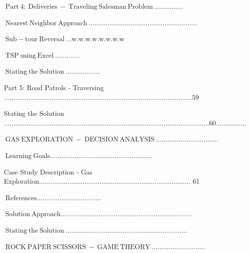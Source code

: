 \documentclass[10pt]{article}
\begin{document}
$\mathrm{~ P a r t ~ 4 : ~ D e l i v e r i e s ~ - ~ T r a v e l i n g ~ S a l e s m a n ~ P r o b l e m ~ . . . . . . . . . . . . . . .}$

$\mathrm{~ N e a r e s t ~ N e i g h b o r ~ A p p r o a c h ~ . . . . . . . . . . . . . . . . . . . . . . . . . . . . . . . . . . . . . . . . . . . . . . . . . . . . . . . . .}$

$\mathrm{~ S u b - t o u r ~ R e v e r s a l ~ . . . w . w . w . w . w . w . w . w}$

$\mathrm{~ T S P ~ u s i n g ~ E x c e l ~ . . . . . . . . . . . . .}$

$\mathrm{~ S t a t i n g ~ t h e ~ S o l u t i o n ~ . . . . . . . . . . . . . . . . . .}$

Part 5: Road Patrols - Traversing $\ldots \ldots \ldots \ldots \ldots \ldots \ldots \ldots \ldots \ldots \ldots \ldots \ldots \ldots \ldots \ldots \ldots \ldots \ldots \ldots \ldots \ldots \ldots \ldots \ldots \ldots \ldots \ldots \ldots \ldots \ldots \ldots \ldots 59$

Stating the Solution $\ldots \ldots \ldots \ldots \ldots \ldots \ldots \ldots \ldots \ldots \ldots \ldots \ldots \ldots \ldots \ldots \ldots \ldots \ldots \ldots \ldots \ldots \ldots \ldots \ldots \ldots \ldots \ldots \ldots \ldots \ldots \ldots \ldots \ldots \ldots \ldots 60 . \ldots \ldots \ldots \ldots \ldots$

$\mathrm{~ G A S ~ E X P L O R A T I O N ~ - ~ D E C I S I O N ~ A N A L Y S I S ~ . . . . . . . . . . . . . . . . . . . . . . . . . . . . . . . . .}$

$\mathrm{~ L e a r n i n g ~ G o a l s . . . . . . . . . . . . . . . . . . . . . . . . . . . . . . . . . . . . . . . . . . . . . . . . . . . . . .}$

Case Study Description - Gas Exploration................................................................................ 61

$\mathrm{~ R e f e r e n c e s . . . . . . . . . . . . . . . . . . . . . . . . . . . . . . . . . .}$

$\mathrm{~ S o l u t i o n ~ A p p r o a c h . . . . . . . . . . . . . . . . . . . . . . . . . . . . . . . . . . . . . . . . . . . . . . . . . . . . . . . . . . . . . . . . . . . . .}$

$\mathrm{~ S t a t i n g ~ t h e ~ S o l u t i o n ~ . . . . . . . . . . . . . . . . . . . . . . . . . . . . . . . . . . . . . . . . . . . . . . . . . . . . . . . . . . . . . . . .}$

$\mathrm{~ R O C K ~ P A P E R ~ S C I S S O R S ~ - ~ G A M E ~ T H E O R Y ~ . . . . . . . . . . . . . . . . . . . . . . . . . . . .}$
\end{document}
